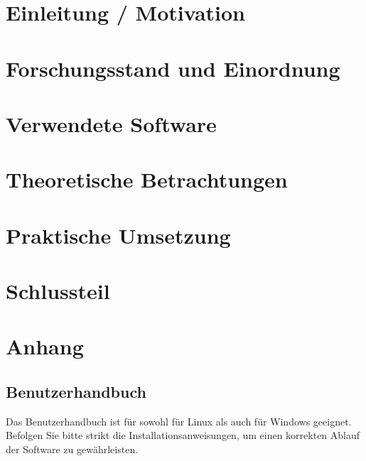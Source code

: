 \documentclass[12pt]{scrreprt}
\theoremstyle{remark}
\begin{document}
\singlespacing
\tableofcontents

\onehalfspacing

\chapter{Einleitung / Motivation}
\label{chap:introduction}


\chapter{Forschungsstand und Einordnung}
\label{chap:forschung}


\chapter{Verwendete Software}
\label{chap:software}


\chapter{Theoretische Betrachtungen}
\label{chap:theorie}



\chapter{Praktische Umsetzung}
\label{chap:praxis}


\chapter{Schlussteil}
\label{chap:ausblick}


%
\printbibliography

\chapter{Anhang}
\section{Benutzerhandbuch} 

Das Benutzerhandbuch ist für sowohl für Linux als auch für Windows geeignet. Befolgen Sie bitte strikt die Installationsanweisungen, um einen korrekten Ablauf der Software zu gewährleisten.\\
\end{document}
